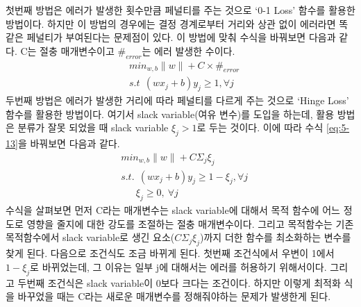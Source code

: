 \documentclass[a4paper]{oblivoir}
\begin{document}
\indent 첫번째 방법은 에러가 발생한 횟수만큼 페널티를 주는 것으로 `0-1 Loss' 함수를 활용한 방법이다. 하지만 이 방법의 경우에는 결정 경계로부터 거리와 상관 없이 에러라면 똑같은 페널티가 부여된다는 문제점이 있다. 이 방법에 맞춰 수식을 바꿔보면 다음과 같다. C는 절충 매개변수이고 $\#_{error}$는 에러 발생한 수이다. 
\begin{equation}
\begin{split}
&min_{w,b} {\lVert w\rVert}+C\times \#_{error}\\
&s.t\ \ (wx_j+b)y_j\geq 1, \forall j
\end{split}
\label{eq:5-14}
\end{equation}
\indent 두번째 방법은 에러가 발생한 거리에 따라 페널티를 다르게 주는 것으로 `Hinge Loss' 함수를 활용한 방법이다. 여기서 slack variable(여유 변수)를 도입을 하는데, 활용 방법은 분류가 잘못 되었을 때 slack variable $\xi_j>1$로 두는 것이다. 이에 따라 수식 \eqref{eq:5-13}을 바꿔보면 다음과 같다. 
\begin{equation}
\begin{split}
&min_{w,b} {\lVert w\rVert}+C\Sigma_{j} \xi_j\\
&s.t.\ \ (wx_j+b)y_j\geq 1-\xi_j, \forall j\\
&\ \ \ \ \ \ \ \xi_j\geq 0,\ \forall j
\end{split}
\label{eq:5-15}
\end{equation}
\indent 수식을 살펴보면 먼저 C라는 매개변수는 slack variable에 대해서 목적 함수에 어느 정도로 영향을 줄지에 대한 강도를 조절하는 절충 매개변수이다. 그리고 목적함수는 기존 목적함수에서 slack variable로 생긴 요소($C\Sigma_{j} \xi_j$)까지 더한 함수를 최소화하는 변수를 찾게 된다. 다음으로 조건식도 조금 바뀌게 된다. 첫번째 조건식에서 우변이 1에서 $1-\xi_j$로 바뀌었는데, 그 이유는 일부 j에 대해서는 에러를 허용하기 위해서이다. 그리고 두번째 조건식은 slack variable이 0보다 크다는 조건이다. 하지만 이렇게 최적화 식을 바꾸었을 때는 C라는 새로운 매개변수를 정해줘야하는 문제가 발생한게 된다.

\end{document}

